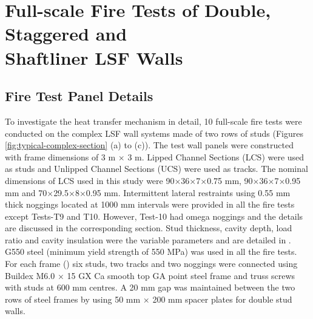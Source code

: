 \section[Full-scale Fire Tests of Double, Staggered and Shaftliner LSF Walls]{Full-scale Fire Tests of Double, Staggered and \\Shaftliner LSF Walls}
\subsection{Fire Test Panel Details}\label{sec:fire-test-panel-details}

To investigate the heat transfer mechanism in detail, 10 full-scale fire tests were conducted on the complex LSF wall systems made of two rows of studs (Figures \ref{fig:typical-complex-section} (a) to (c)). The test wall panels were constructed with frame dimensions of 3 m \(\times\) 3 m. Lipped Channel Sections (LCS) were used as studs and Unlipped Channel Sections (UCS) were used as tracks. The nominal dimensions of LCS used in this study were 90$\times$36$\times$7$\times$0.75 mm, 90$\times$36$\times$7$\times$0.95 mm and 70$\times$29.5$\times$8$\times$0.95 mm. Intermittent lateral restraints using 0.55 mm thick noggings located at 1000 mm intervals were provided in all the fire tests except Tests-T9 and T10. However, Test-10 had omega noggings and the details are discussed in the corresponding section. Stud thickness, cavity depth, load ratio and cavity insulation were the variable parameters and are detailed in . G550 steel (minimum yield strength of 550 MPa) was used in all the fire tests. For each frame () six studs, two tracks and two noggings were connected using Buildex M6.0 \(\times\) 15 GX Ca smooth top GA point steel frame and truss screws with studs at 600 mm centres. A 20 mm gap was maintained between the two rows of steel frames by using 50 mm $\times$ 200 mm spacer plates for double stud walls. 
